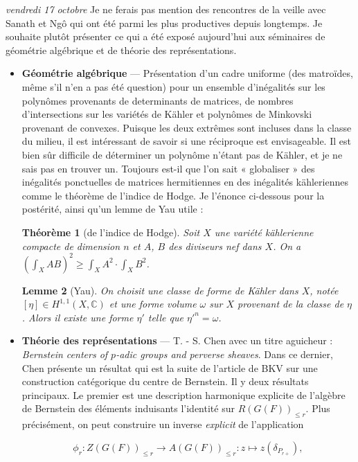 \documentclass[11.8pt]{amsart}
\newcommand\C{\mathbb C}
\theoremstyle{plain}
\newtheorem{thm}{Théorème}[section]
\newtheorem{lem}[thm]{Lemme}
\theoremstyle{definition}
\theoremstyle{remark}
\begin{document}
\textsl{vendredi 17 octobre} \quad Je ne ferais pas mention des rencontres de la veille avec Sanath et Ngô qui ont été parmi les plus productives depuis longtemps. Je souhaite plutôt présenter ce qui a été exposé aujourd'hui aux séminaires de géométrie algébrique et de théorie des représentations. \begin{itemize}
\item \textbf{Géométrie algébrique} — Présentation d'un cadre uniforme (des matroïdes, même s'il n'en a pas été question) pour un ensemble d'inégalités sur les polynômes provenants de determinants de matrices, de nombres d'intersections sur les variétés de Kähler et polynômes de Minkovski provenant de convexes. Puisque les deux extrêmes sont incluses dans la classe du milieu, il est intéressant de savoir si une réciproque est envisageable. Il est bien sûr difficile de déterminer un polynôme n'étant pas de Kähler, et je ne sais pas en trouver un. Toujours est-il que l'on sait « globaliser » des inégalités ponctuelles de matrices hermitiennes en des inégalités kähleriennes comme le théorème de l'indice de Hodge. Je l'énonce ci-dessous pour la postérité, ainsi qu'un lemme de Yau utile : 

\begin{thm}[de l'indice de Hodge] Soit $X$ une variété kählerienne compacte de dimension $n$ et $A$, $B$ des diviseurs nef dans $X$. On a $\left(\int_X AB\right)^2 \ge \int_X A^2\cdot \int_X B^2$.
\end{thm}

\begin{lem}[Yau] On choisit une classe de forme de Kähler dans $X$, notée $[\eta]\in H^{1,1}(X,\C)$ et une forme volume $\omega$ sur $X$ provenant de la classe de $\eta$. Alors il existe une forme $\eta'$ telle que $\eta'^n = \omega$.
\end{lem}

\item \textbf{Théorie des représentations} — T. - S. Chen avec un titre aguicheur : \textit{Bernstein centers of $p$-adic groups and perverse sheaves}. Dans ce dernier, Chen présente un résultat qui est la suite de l'article de BKV sur une construction catégorique du centre de Bernstein. Il y deux résultats principaux. Le premier est une description harmonique explicite de l'algèbre de Bernstein des éléments induisants l'identité sur $R(G(F))_{\le r}$. Plus précisément, on peut construire un inverse \textit{explicit} de l'application 

$$\phi_r : Z(G(F))_{\le r}\longrightarrow A(G(F))_{\le r} : z \longmapsto z(\delta_{P_{r+}}),$$


\end{itemize}
\end{document}
